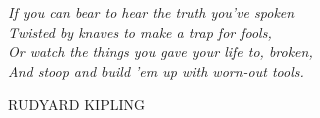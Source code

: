 
\pagebreak
\thispagestyle{empty}
\null\vfill

\begin{minipage}[t]{\linewidth}
    \newlength\longest
    \settowidth{}
    \centering
    \parbox{\longest}{%
    \raggedright{
    \Large\itshape%
        If you can bear to hear the truth you've spoken \\
        Twisted by knaves to make a trap for fools, \\
        Or watch the things you gave your life to, broken, \\
        And stoop and build 'em up with worn-out tools. \\
    \par\bigskip}
    \raggedleft\Large\MakeUppercase{Rudyard Kipling}\par%
    }
\end{minipage}
\vfill\vfill
\clearpage
\pagebreak